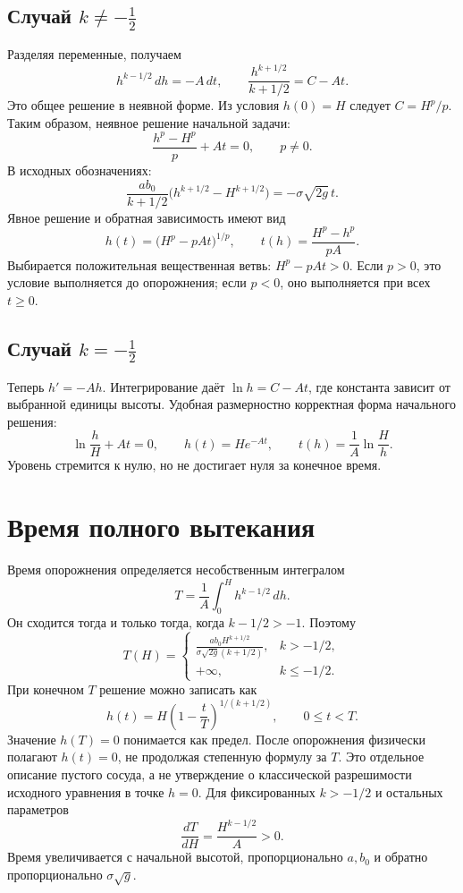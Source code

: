 ﻿\documentclass[12pt,a4paper]{article}
\begin{document}
\subsection{Случай $k\ne-\tfrac12$}
Разделяя переменные, получаем
\[
h^{k-1/2}\,dh=-A\,dt,\qquad
\frac{h^{k+1/2}}{k+1/2}=C-At.
\]
Это общее решение в неявной форме. Из условия $h(0)=H$ следует $C=H^p/p$. Таким образом, неявное решение начальной задачи:
\begin{equation}
\boxed{\frac{h^p-H^p}{p}+At=0,\qquad p\ne0.}
\end{equation}
В исходных обозначениях:
\[
\frac{ab_0}{k+1/2}\bigl(h^{k+1/2}-H^{k+1/2}\bigr)
=-\sigma\sqrt{2g}\,t.
\]
Явное решение и обратная зависимость имеют вид
\begin{equation}
\boxed{h(t)=\bigl(H^p-pAt\bigr)^{1/p}},\qquad
\boxed{t(h)=\frac{H^p-h^p}{pA}}.
\end{equation}
Выбирается положительная вещественная ветвь: $H^p-pAt>0$. Если $p>0$, это условие выполняется до опорожнения; если $p<0$, оно выполняется при всех $t\ge0$.

\subsection{Случай $k=-\tfrac12$}
Теперь $h'=-Ah$. Интегрирование даёт $\ln h=C-At$, где константа зависит от выбранной единицы высоты. Удобная размерностно корректная форма начального решения:
\begin{equation}
\boxed{\ln\frac{h}{H}+At=0},\qquad
\boxed{h(t)=H e^{-At}},\qquad
\boxed{t(h)=\frac1A\ln\frac{H}{h}}.
\end{equation}
Уровень стремится к нулю, но не достигает нуля за конечное время.

\section{Время полного вытекания}
Время опорожнения определяется несобственным интегралом
\[
T=\frac1A\int_0^H h^{k-1/2}\,dh.
\]
Он сходится тогда и только тогда, когда $k-1/2>-1$. Поэтому
\begin{equation}
\boxed{T(H)=\begin{cases}
\displaystyle\frac{ab_0H^{k+1/2}}{\sigma\sqrt{2g}(k+1/2)},&k>-1/2,\\[6pt]
+\infty,&k\le-1/2.
\end{cases}}
\end{equation}
При конечном $T$ решение можно записать как
\[
h(t)=H\left(1-\frac{t}{T}\right)^{1/(k+1/2)},\qquad 0\le t<T.
\]
Значение $h(T)=0$ понимается как предел. После опорожнения физически полагают $h(t)=0$, не продолжая степенную формулу за $T$. Это отдельное описание пустого сосуда, а не утверждение о классической разрешимости исходного уравнения в точке $h=0$.
Для фиксированных $k>-1/2$ и остальных параметров
\[
\frac{dT}{dH}=\frac{H^{k-1/2}}A>0.
\]
Время увеличивается с начальной высотой, пропорционально $a,b_0$ и обратно пропорционально $\sigma\sqrt g$.
\end{document}
